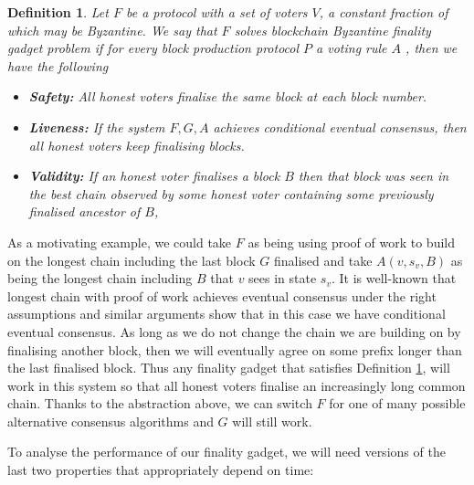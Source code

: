 \documentclass{article}
\newtheorem{definition}[theorem]{Definition}
\begin{document}
\begin{definition} \label{def:finality-gadget} 
Let $F$ be a protocol  with a set of voters $V$, a constant fraction of which may be Byzantine.
We say that $F$ solves {\em blockchain Byzantine finality gadget problem} if for every block production protocol $P$ a voting rule $A$ , then we have the following


\begin{itemize}
\item{\bf Safety:} All honest voters finalise the same block at each block number.
\item{\bf Liveness:} If the system $F,G,A$ achieves conditional eventual consensus, then all honest voters keep finalising blocks.
\item{\bf Validity:} If an honest voter finalises a block $B$ then that block was seen in the best chain observed by some honest voter containing some previously finalised ancestor of $B$,
\end{itemize}

\end{definition}

As a motivating example, we could take $F$ as being using proof of work to build on the longest chain including the last block $G$ finalised and take $A(v,s_v,B)$ as being the longest chain including $B$ that $v$ sees in state $s_v$. It is well-known \cite{bitcoinpapers} that longest chain with proof of work achieves eventual consensus under the right assumptions and similar arguments show that in this case we have conditional eventual consensus.
As long as we do not change the chain we are building on by finalising another block, then we will eventually agree on some prefix longer than the last finalised block.
Thus any finality gadget that satisfies Definition \ref{def:finality-gadget}, will work in this system so that all honest voters finalise an increasingly long common chain.
Thanks to the abstraction above, we can switch $F$ for one of many possible alternative consensus algorithms and $G$ will still work.


To analyse the performance of our finality gadget, we will need versions of the last two properties that appropriately depend on time: 
\end{document}
